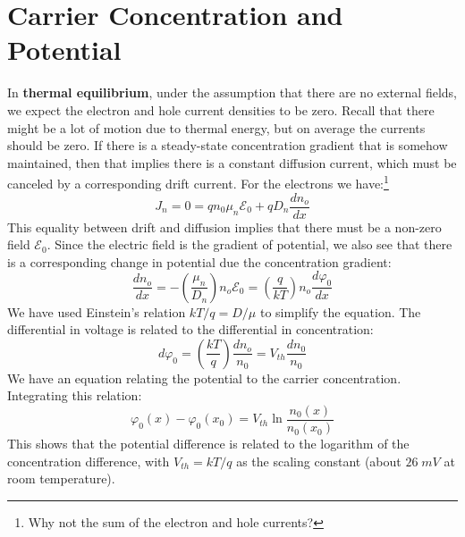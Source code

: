 \section{Carrier Concentration and Potential}
In \textbf{thermal equilibrium}, under the assumption that there are no external fields, we expect the electron and hole current densities to be zero.  Recall that there might be a lot of motion due to thermal energy, but on average the currents should be zero.  If there is a steady-state concentration gradient that is somehow maintained, then that implies there is a constant diffusion current, which must be canceled by a corresponding drift current.  For the electrons we have:\footnote{Why not the sum of the electron and hole currents?}
    \begin{equation}
        J_n = 0 = q{n_0}{\mu _n}{\mathcal{E}_0} + q{D_n}\frac{{d{n_o}}}{{dx}} 
    \end{equation}
This equality between drift and diffusion implies that there must be a non-zero field $\mathcal{E}_0$.  Since the electric field is the gradient of potential, we also see that there is a corresponding change in potential due the concentration gradient:
    \begin{equation} 
        \frac{d{n_o}}{dx} = -\left( \frac{\mu_n}{D_n} \right){n_o}{\mathcal{E}_0} 
        = \left( \frac{q}{kT} \right){n_o}\frac{d{\varphi _0}}{dx} 
    \end{equation}
We have used Einstein's relation $kT/q = D/\mu$ to simplify the equation.  The differential in voltage is related to the differential in concentration:
    \begin{equation} 
        d\varphi_0 = \left( \frac{kT}{q} \right)\frac{d{n_o}}{n_0} = V_{th}\frac{d{n_0}}{n_0} 
    \end{equation}
We have an equation relating the potential to the carrier concentration.  Integrating this relation:
    \begin{equation}
        \varphi_0(x) - \varphi_0(x_0) = V_{th}\ln \frac{n_0(x)}{n_0(x_0)}
    \end{equation}
This shows that the potential difference is related to the logarithm of the concentration difference, with $V_{th} = kT/q$ as the scaling constant (about $26\;mV$ at room temperature). 

